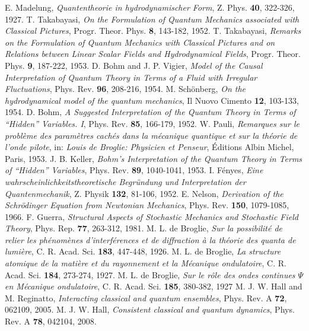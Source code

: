 \documentclass [12pt]{revtex4}
\begin{document}
\begin{thebibliography}{99}
 E. Madelung, {\it Quantentheorie in hydrodynamischer Form}, Z. Phys. \textbf{40}, 322-326, 1927.
 T. Takabayasi, {\it On the Formulation of Quantum Mechanics associated with Classical Pictures}, Progr. Theor. Phys. \textbf{8}, 143-182, 1952.
 T. Takabayasi, {\it Remarks on the Formulation of Quantum Mechanics with Classical Pictures and on Relations between Linear Scalar Fields and Hydrodynamical Fields}, Progr. Theor. Phys. \textbf{9}, 187-222, 1953.
 D. Bohm and J. P. Vigier, {\it Model of the Causal Interpretation of Quantum Theory in Terms of a Fluid with Irregular Fluctuations}, Phys. Rev. \textbf{96}, 208-216, 1954.
 M. Sch\"{o}nberg, {\it On the hydrodynamical model of the quantum mechanics}, Il Nuovo Cimento \textbf{12}, 103-133, 1954.
 D. Bohm, {\it A Suggested Interpretation of the Quantum Theory in Terms of ``Hidden'' Variables. I}, Phys. Rev. \textbf{85}, 166-179, 1952.
 W. Pauli, {\it Remarques sur le probl\`{e}me des param\`{e}tres cach\'{e}s dans la m\'{e}canique quantique et sur la th\'{e}orie de l'onde pilote}, in: {\it Louis de Broglie: Physicien et Penseur}, \'{E}ditions Albin Michel, Paris, 1953.
 J. B. Keller, {\it Bohm's Interpretation of the Quantum Theory in Terms of ``Hidden'' Variables}, Phys. Rev. \textbf{89}, 1040-1041, 1953.
 I. F\'{e}nyes, {\it Eine wahrscheinlichkeitstheoretische Begr\"{u}ndung und Interpretation der Quantenmechanik}, Z. Physik \textbf{132}, 81-106, 1952.
 E. Nelson, {\it Derivation of the Schr\"{o}dinger Equation from Newtonian Mechanics}, Phys. Rev. \textbf{150}, 1079-1085, 1966.
 F. Guerra, {\it Structural Aspects of Stochastic Mechanics and Stochastic Field Theory}, Phys. Rep. \textbf{77}, 263-312, 1981.
 M. L. de Broglie, {\it  Sur la possibilit\'{e} de relier les ph\'{e}nom\`{e}nes d'interf\'{e}rences et de diffraction \`{a} la th\'{e}orie des quanta de lumi\`{e}re}, C. R. Acad. Sci. \textbf{183}, 447-448, 1926.
 M. L. de Broglie, {\it La structure atomique de la mati\`{e}re et du rayonnement et la M\'{e}canique ondulatoire}, C. R. Acad. Sci. \textbf{184}, 273-274, 1927.
 M. L. de Broglie, {\it  Sur le r\^{o}le des ondes continues $\Psi$ en M\'{e}canique ondulatoire}, C. R. Acad. Sci. \textbf{185}, 380-382, 1927
 M. J. W. Hall and M. Reginatto, {\it Interacting classical and quantum ensembles}, Phys. Rev. A {\bf 72}, 062109, 2005.
 M. J. W. Hall, {\it Consistent classical and quantum dynamics}, Phys. Rev. A \textbf{78}, 042104, 2008.

\end{thebibliography}
\end{document}
